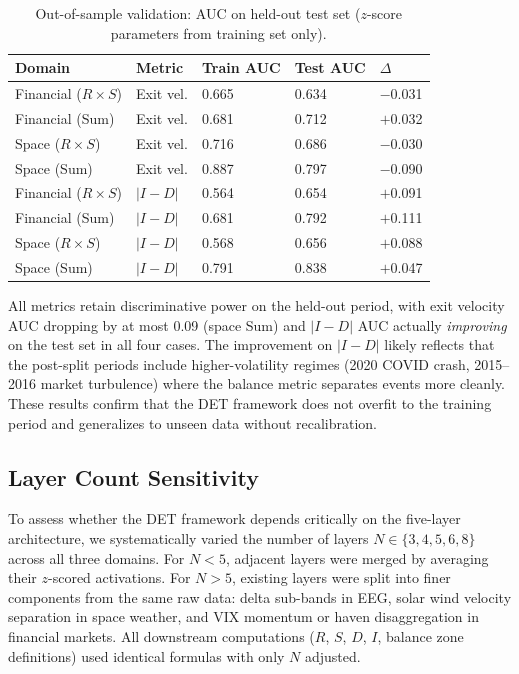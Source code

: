 \documentclass[aip,cha,reprint,amsmath,amssymb]{revtex4-2}
\begin{document}
\begin{table}[h]
\caption{\label{tab:oos}Out-of-sample validation: AUC on held-out test set ($z$-score parameters from training set only).}
\centering
\begin{tabular}{lllll}
Domain & Metric & Train AUC & Test AUC & $\Delta$ \\
\hline
Financial ($R \times S$) & Exit vel. & 0.665 & 0.634 & $-$0.031 \\
Financial (Sum) & Exit vel. & 0.681 & 0.712 & $+$0.032 \\
Space ($R \times S$) & Exit vel. & 0.716 & 0.686 & $-$0.030 \\
Space (Sum) & Exit vel. & 0.887 & 0.797 & $-$0.090 \\
Financial ($R \times S$) & $|I{-}D|$ & 0.564 & 0.654 & $+$0.091 \\
Financial (Sum) & $|I{-}D|$ & 0.681 & 0.792 & $+$0.111 \\
Space ($R \times S$) & $|I{-}D|$ & 0.568 & 0.656 & $+$0.088 \\
Space (Sum) & $|I{-}D|$ & 0.791 & 0.838 & $+$0.047 \\
\end{tabular}
\end{table}

All metrics retain discriminative power on the held-out period, with exit velocity AUC dropping by at most 0.09 (space Sum) and $|I{-}D|$ AUC actually \emph{improving} on the test set in all four cases. The improvement on $|I{-}D|$ likely reflects that the post-split periods include higher-volatility regimes (2020 COVID crash, 2015--2016 market turbulence) where the balance metric separates events more cleanly. These results confirm that the DET framework does not overfit to the training period and generalizes to unseen data without recalibration.

\subsection{Layer Count Sensitivity}

To assess whether the DET framework depends critically on the five-layer architecture, we systematically varied the number of layers $N \in \{3, 4, 5, 6, 8\}$ across all three domains. For $N < 5$, adjacent layers were merged by averaging their $z$-scored activations. For $N > 5$, existing layers were split into finer components from the same raw data: delta sub-bands in EEG, solar wind velocity separation in space weather, and VIX momentum or haven disaggregation in financial markets. All downstream computations ($R$, $S$, $D$, $I$, balance zone definitions) used identical formulas with only $N$ adjusted.
\end{document}

